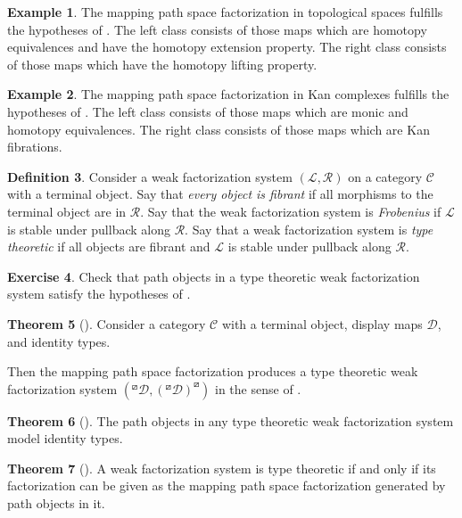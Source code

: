 \documentclass{article}
\theoremstyle{definition}
\newtheorem{definition}{Definition}[section]
\newtheorem{theorem}[definition]{Theorem}
\newtheorem{exercise}[definition]{Exercise}
\newtheorem{example}[definition]{Example}
\newcommand{\C}{\mathcal C}
\newcommand{\D}{\mathcal D}
\begin{document}
\begin{example}
    The mapping path space factorization in topological spaces fulfills the hypotheses of . The left class consists of those maps which are homotopy equivalences and have the homotopy extension property. The right class consists of those maps which have the homotopy lifting property.
\end{example}

\begin{example}
    The mapping path space factorization in Kan complexes fulfills the hypotheses of . The left class consists of those maps which are monic and homotopy equivalences. The right class consists of those maps which are Kan fibrations.
\end{example}

\begin{definition}
    Consider a weak factorization system $(\mathcal L, \mathcal R)$ on a category $\C$ with a terminal object. Say that \emph{every object is fibrant} if all morphisms to the terminal object are in $\mathcal R$. Say that the weak factorization system is \emph{Frobenius} if $\mathcal L$ is stable under pullback along $\mathcal R$. Say that a weak factorization system is \emph{type theoretic} if all objects are fibrant and $\mathcal L$ is stable under pullback along $\mathcal R$.
\end{definition}

\begin{exercise}
    Check that path objects in a type theoretic weak factorization system satisfy the hypotheses of .
\end{exercise}

\begin{theorem}[\cite{gambino-garner}]
    Consider a category $\C$ with a terminal object, display maps $\D$, and identity types. 

    Then the mapping path space factorization produces a type theoretic weak factorization system $(^\boxslash\D, ({^\boxslash}\D)^\boxslash)$ in the sense of .
\end{theorem}

\begin{theorem}[\cite{north}]
    The path objects in any type theoretic weak factorization system model identity types.
\end{theorem}

\begin{theorem}[\cite{north}]
    A weak factorization system is type theoretic if and only if its factorization can be given as the mapping path space factorization generated by path objects in it.
\end{theorem}
\end{document}
